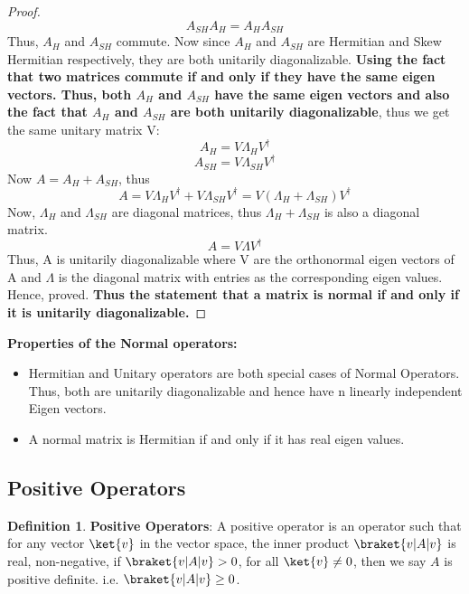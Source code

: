 \documentclass[12pt, oneside]{book}
\theoremstyle{definition}
\newtheorem{definition}{Definition}[section]
\theoremstyle{definition}
\theoremstyle{remark}
\begin{document}
\begin{proof}
    \[A_{SH}A_H=A_HA_{SH}\]
    Thus, $A_H$ and $A_{SH}$ commute. Now since $A_H$ and $A_{SH}$ are Hermitian and Skew Hermitian respectively, they are both unitarily diagonalizable.
    \textbf{Using the fact that two matrices commute if and only if they have the same eigen vectors. Thus, both $A_H$ and $A_{SH}$ have the same eigen vectors and also the fact that 
    $A_H$ and $A_{SH}$ are both unitarily diagonalizable}, thus we get the same
    unitary matrix V:
    \[ A_H=V\Lambda_H V^{\dagger} \]
    \[ A_{SH}=V\Lambda_{SH} V^{\dagger} \]
    Now $A=A_H+A_{SH}$, thus
    \[ A=V\Lambda_H V^{\dagger} + V\Lambda_{SH} V^{\dagger} = V(\Lambda_H + \Lambda_{SH})V^{\dagger} \]
    Now, $\Lambda_H$ and $\Lambda_{SH}$ are diagonal matrices, thus $\Lambda_H + \Lambda_{SH}$ is also a diagonal matrix.
    \[ A = V\Lambda V^{\dagger} \]
    Thus, A is unitarily diagonalizable where V are the orthonormal eigen vectors of A and $\Lambda$ is the diagonal matrix
    with entries as the corresponding eigen values. Hence, proved.
    \textbf{Thus the statement that a matrix is normal if and only if it is unitarily diagonalizable.}
\end{proof}
\textbf{Properties of the Normal operators: }
\begin{itemize}
    \item Hermitian and Unitary operators are both special cases of Normal Operators. Thus, both are unitarily 
    diagonalizable and hence have n linearly independent Eigen vectors.
    \item A normal matrix is Hermitian if and only if it has real eigen values.
\end{itemize}

\subsection{Positive Operators}

\begin{definition}
\textbf{Positive Operators}: A positive operator is an operator such that for any vector $\ket{v}$ in the vector space, the inner product $\braket{v|A|v}$ is real, non-negative, if $\braket{v|A|v} > 0$, for all $\ket{v} \neq 0$, then we say $A$ is positive definite.
i.e. $\braket{v|A|v} \geq 0$.\\
\end{definition}
\end{document}
